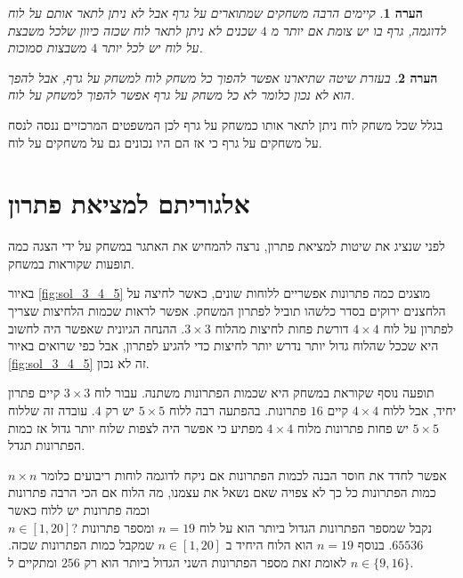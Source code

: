 \documentclass[12pt,leqno]{article}
\theoremstyle{theoremdd}
\newtheorem{comm}{הערה}[section]
\begin{document}
\begin{comm}
    קיימים הרבה משחקים שמתוארים על גרף אבל לא ניתן לתאר אותם על לוח
    לדוגמה,
    גרף בו יש צומת אם יותר מ
    $4$
    שכנים לא ניתן לתאר לוח שכזה כיוון שלכל משבצת על לוח
    יש לכל יותר 
    $4$
    משבצות סמוכות.
\end{comm}

\begin{comm}
    בעזרת שיטה שתיארנו אפשר להפוך כל משחק לוח למשחק על גרף, אבל להפך הוא לא נכון 
    כלומר לא כל משחק על גרף אפשר להפוך למשחק על לוח.
\end{comm}

בגלל שכל משחק לוח ניתן לתאר אותו כמשחק על גרף לכן המשפטים המרכזיים ננסה לנסח על משחקים על גרף כי אז הם היו נכונים
גם על משחקים על לוח.


\newpage

\section{ אלגוריתם למציאת פתרון}

לפני שנציג את שיטות למציאת פתרון, נרצה להמחיש את 
האתגר במשחק על ידי הצגה כמה תופעות שקוראות במשחק.

באיור
\ref{fig:sol_3_4_5}
מוצגים כמה פתרונות אפשריים ללוחות שונים, כאשר לחיצה על הלחצנים ירוקים
בסדר כלשהו תוביל לפתרון המשחק.
אפשר לראות שכמות הלחיצות שצריך לפתרון 
על לוח 
$4 \times 4$
דורשת פחות לחיצות מהלוח 
$3 \times 3$.
ההנחה הגיונית 
שאפשר היה לחשוב היא שככל שהלוח גדול יותר נדרש 
יותר לחיצות 
כדי להגיע לפתרון,
אבל כפי שרואים 
באיור 
\ref{fig:sol_3_4_5}
זה לא נכון.

תופעה נוסף שקוראת במשחק היא שכמות הפתרונות משתנה.
עבור לוח 
$3 \times 3$
קיים פתרון יחיד,
אבל ללוח 
$4 \times 4$
קיים
$16$
פתרונות.
בהפתעה רבה ללוח 
$5 \times 5$
יש רק 
$4$.
עובדה זה שללוח 
$5 \times 5$
יש פחות פתרונות מלוח 
$4 \times 4$
מפתיע כי אפשר היה לצפות שלוח יותר גדול אז כמות הפתרונות תגדל.

אפשר לחדד את חוסר הבנה לכמות הפתרונות אם ניקח לדוגמה לוחות ריבועים כלומר
$n \times n$
כמות הפתרונות כל כך לא צפויה
שאם נשאל את עצמנו, מה הלוח אם הכי הרבה פתרונות וכמה פתרונות יש ללוח כאשר
\\
$n \in [1,20]$?
נקבל שמספר הפתרונות הגדול ביותר הוא על לוח
$n = 19$ 
ומספר פתרונות 
$65536$.
בנוסף
$n = 19$ 
הוא הלוח היחיד ב
$n \in [1,20]$
שמקבל
כמות הפתרונות שכזה.
לאומת זאת
מספר הפתרונות השני הגדול ביותר הוא רק
$256$
ומתקיים ל
$n \in \{9, 16 \}$.
\end{document}
